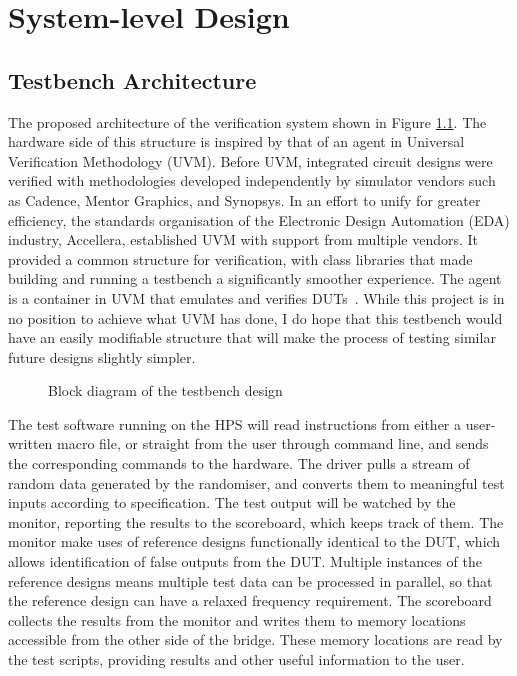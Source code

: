 \chapter{System-level Design}

\section{Testbench Architecture}
The proposed architecture of the verification system shown in Figure \ref{Block}.
The hardware side of this structure is inspired by that of an agent in Universal Verification Methodology (UVM).
Before UVM, integrated circuit designs were verified with methodologies developed independently by simulator vendors such as Cadence, Mentor Graphics, and Synopsys.
In an effort to unify for greater efficiency, the standards organisation of the Electronic Design Automation (EDA) industry, Accellera, established UVM with support from multiple vendors.
It provided a common structure for verification, with class libraries that made building and running a testbench a significantly smoother experience.
The agent is a container in UVM that emulates and verifies DUTs~\cite{Accellera1}.
While this project is in no position to achieve what UVM has done, I do hope that this testbench would have an easily modifiable structure that will make the process of testing similar future designs slightly simpler.

\begin{figure}[H]
  \centering
  
  \caption{Block diagram of the testbench design}
  \label{Block}
\end{figure}

The test software running on the HPS will read instructions from either a user-written macro file, or straight from the user through command line, and sends the corresponding commands to the hardware.
The driver pulls a stream of random data generated by the randomiser, and converts them to meaningful test inputs according to specification.
The test output will be watched by the monitor, reporting the results to the scoreboard, which keeps track of them.
The monitor make uses of reference designs functionally identical to the DUT, which allows identification of false outputs from the DUT.
Multiple instances of the reference designs means multiple test data can be processed in parallel, so that the reference design can have a relaxed frequency requirement.
The scoreboard collects the results from the monitor and writes them to memory locations accessible from the other side of the bridge.
These memory locations are read by the test scripts, providing results and other useful information to the user.

